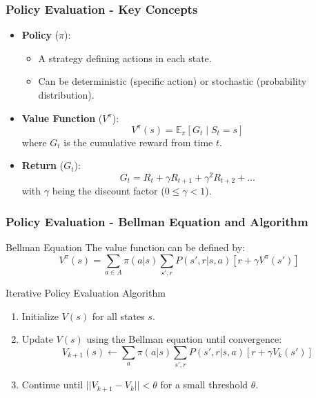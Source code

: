 \documentclass[aspectratio=169]{beamer}
\begin{document}
\begin{frame}[fragile]
    \frametitle{Policy Evaluation - Key Concepts}
    \begin{itemize}
        \item \textbf{Policy} (\( \pi \)):
        \begin{itemize}
            \item A strategy defining actions in each state.
            \item Can be deterministic (specific action) or stochastic (probability distribution).
        \end{itemize}
        
        \item \textbf{Value Function} (\( V^\pi \)):
        \begin{equation}
        V^\pi(s) = \mathbb{E}_\pi \left[ G_t \mid S_t = s \right]
        \end{equation}
        where \( G_t \) is the cumulative reward from time \( t \).

        \item \textbf{Return} (\( G_t \)):
        \begin{equation}
        G_t = R_t + \gamma R_{t+1} + \gamma^2 R_{t+2} + \ldots
        \end{equation}
        with \( \gamma \) being the discount factor (\( 0 \leq \gamma < 1 \)).
    \end{itemize}
\end{frame}

\begin{frame}[fragile]
    \frametitle{Policy Evaluation - Bellman Equation and Algorithm}
    \begin{block}{Bellman Equation}
        The value function can be defined by:
        \begin{equation}
        V^\pi(s) = \sum_{a \in A} \pi(a|s) \sum_{s', r} P(s', r | s, a) \left[ r + \gamma V^\pi(s') \right]
        \end{equation}
    \end{block}

    \begin{block}{Iterative Policy Evaluation Algorithm}
    \begin{enumerate}
        \item Initialize \( V(s) \) for all states \( s \).
        \item Update \( V(s) \) using the Bellman equation until convergence:
        \begin{equation}
        V_{k+1}(s) \gets \sum_{a} \pi(a|s) \sum_{s', r} P(s', r | s, a) \left[ r + \gamma V_k(s') \right]
        \end{equation}
        \item Continue until \( ||V_{k+1} - V_k|| < \theta \) for a small threshold \( \theta \).
    \end{enumerate}
    \end{block}
\end{frame}
\end{document}
